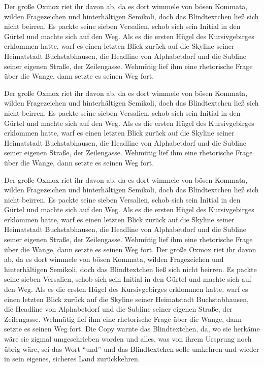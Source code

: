 \documentclass[%
	12pt,%
	a4paper,%
	oneside,%
	listof=totoc,
 	index=totoc,
	bibliography = totoc,
	parskip = half,%
	chapterprefix=false,%
	appendixprefix, %
headings=small,%
]{scrreprt}
\begin{document}
Der große Oxmox riet ihr davon ab, da es dort wimmele von bösen Kommata, wilden Fragezeichen und hinterhältigen Semikoli, doch das Blindtextchen ließ sich nicht beirren. Es packte seine sieben Versalien, schob sich sein Initial in den Gürtel und machte sich auf den Weg. Als es die ersten Hügel des Kursivgebirges erklommen hatte, warf es einen letzten Blick zurück auf die Skyline seiner Heimatstadt Buchstabhausen, die Headline von Alphabetdorf und die Subline seiner eigenen Straße, der Zeilengasse. Wehmütig lief ihm eine rhetorische Frage über die Wange, dann setzte es seinen Weg fort.

Der große Oxmox riet ihr davon ab, da es dort wimmele von bösen Kommata, wilden Fragezeichen und hinterhältigen Semikoli, doch das Blindtextchen ließ sich nicht beirren. Es packte seine sieben Versalien, schob sich sein Initial in den Gürtel und machte sich auf den Weg. Als es die ersten Hügel des Kursivgebirges erklommen hatte, warf es einen letzten Blick zurück auf die Skyline seiner Heimatstadt Buchstabhausen, die Headline von Alphabetdorf und die Subline seiner eigenen Straße, der Zeilengasse. Wehmütig lief ihm eine rhetorische Frage über die Wange, dann setzte es seinen Weg fort.

Der große Oxmox riet ihr davon ab, da es dort wimmele von bösen Kommata, wilden Fragezeichen und hinterhältigen Semikoli, doch das Blindtextchen ließ sich nicht beirren. Es packte seine sieben Versalien, schob sich sein Initial in den Gürtel und machte sich auf den Weg. Als es die ersten Hügel des Kursivgebirges erklommen hatte, warf es einen letzten Blick zurück auf die Skyline seiner Heimatstadt Buchstabhausen, die Headline von Alphabetdorf und die Subline seiner eigenen Straße, der Zeilengasse. Wehmütig lief ihm eine rhetorische Frage über die Wange, dann setzte es seinen Weg fort. Der große Oxmox riet ihr davon ab, da es dort wimmele von bösen Kommata, wilden Fragezeichen und hinterhältigen Semikoli, doch das Blindtextchen ließ sich nicht beirren. Es packte seine sieben Versalien, schob sich sein Initial in den Gürtel und machte sich auf den Weg. Als es die ersten Hügel des Kursivgebirges erklommen hatte, warf es einen letzten Blick zurück auf die Skyline seiner Heimatstadt Buchstabhausen, die Headline von Alphabetdorf und die Subline seiner eigenen Straße, der Zeilengasse. Wehmütig lief ihm eine rhetorische Frage über die Wange, dann setzte es seinen Weg fort. Die Copy warnte das Blindtextchen, da, wo sie herkäme wäre sie zigmal umgeschrieben worden und alles, was von ihrem Ursprung noch übrig wäre, sei das Wort "`und"'  und das Blindtextchen solle umkehren und wieder in sein eigenes, sicheres Land zurückkehren.
\end{document}
